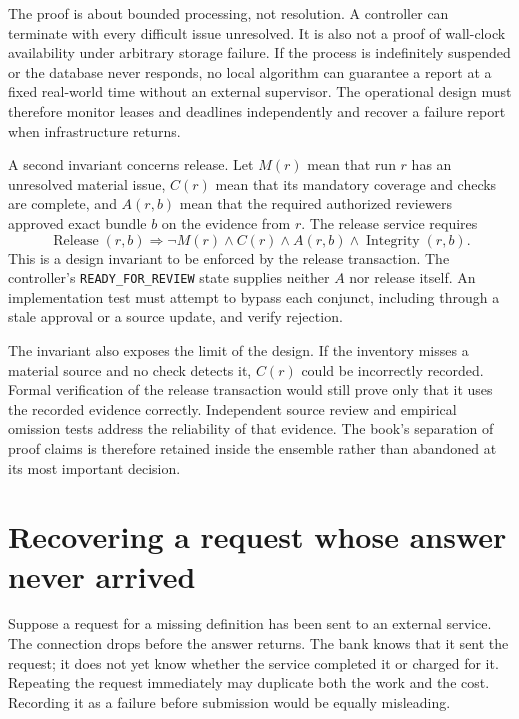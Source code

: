 
The proof is about bounded processing, not resolution. A controller can terminate
with every difficult issue unresolved. It is also not a proof of wall-clock
availability under arbitrary storage failure. If the process is indefinitely
suspended or the database never responds, no local algorithm can guarantee a
report at a fixed real-world time without an external supervisor. The operational
design must therefore monitor leases and deadlines independently and recover a
failure report when infrastructure returns.

A second invariant concerns release. Let $M(r)$ mean that run $r$ has an unresolved
material issue, $C(r)$ mean that its mandatory coverage and checks are complete,
and $A(r,b)$ mean that the required authorized reviewers approved exact bundle
$b$ on the evidence from $r$. The release service requires
\begin{equation}
 \operatorname{Release}(r,b)\Longrightarrow
 \neg M(r)\land C(r)\land A(r,b)\land\operatorname{Integrity}(r,b).
 \label{eq:ensemble-release}
\end{equation}
This is a design invariant to be enforced by the release transaction. The
controller's \texttt{READY\_FOR\_REVIEW} state supplies neither $A$ nor release
itself. An implementation test must attempt to bypass each conjunct, including
through a stale approval or a source update, and verify rejection.

The invariant also exposes the limit of the design. If the inventory misses a
material source and no check detects it, $C(r)$ could be incorrectly recorded.
Formal verification of the release transaction would still prove only that it
uses the recorded evidence correctly. Independent source review and empirical
omission tests address the reliability of that evidence. The book's separation
of proof claims is therefore retained inside the ensemble rather than abandoned
at its most important decision.

\section{Recovering a request whose answer never arrived}
\label{merge:M06:17}


Suppose a request for a missing definition has been sent to an external service.
The connection drops before the answer returns. The bank knows that it sent the
request; it does not yet know whether the service completed it or charged for it.
Repeating the request immediately may duplicate both the work and the cost.
Recording it as a failure before submission would be equally misleading.

